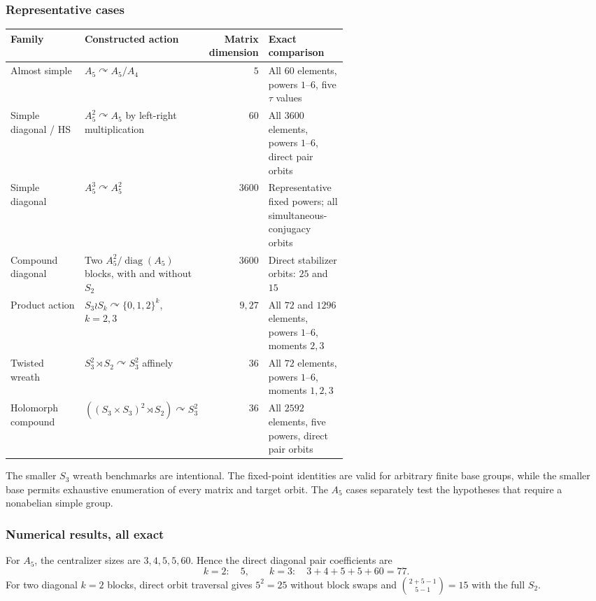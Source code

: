 \documentclass[10pt]{article}
\begin{document}
\subsubsection{Representative cases}

\begin{center}
\small
\begin{tabularx}{\linewidth}{@{}p{0.22\linewidth}p{0.34\linewidth}rX@{}}
\toprule
Family & Constructed action & Matrix dimension & Exact comparison \\
\midrule
Almost simple
& $A_5\curvearrowright A_5/A_4$
& $5$
& All $60$ elements, powers $1$--$6$, five $\tau$ values \\
Simple diagonal / HS
& $A_5^2\curvearrowright A_5$ by left-right multiplication
& $60$
& All $3600$ elements, powers $1$--$6$, direct pair orbits \\
Simple diagonal
& $A_5^3\curvearrowright A_5^2$
& $3600$
& Representative fixed powers; all simultaneous-conjugacy orbits \\
Compound diagonal
& Two $A_5^2/\operatorname{diag}(A_5)$ blocks, with and without $S_2$
& $3600$
& Direct stabilizer orbits: $25$ and $15$ \\
Product action
& $S_3\wr S_k\curvearrowright\{0,1,2\}^k$, $k=2,3$
& $9,27$
& All $72$ and $1296$ elements, powers $1$--$6$, moments $2,3$ \\
Twisted wreath
& $S_3^2\rtimes S_2\curvearrowright S_3^2$ affinely
& $36$
& All $72$ elements, powers $1$--$6$, moments $1,2,3$ \\
Holomorph compound
& $((S_3\times S_3)^2\rtimes S_2)\curvearrowright S_3^2$
& $36$
& All $2592$ elements, five powers, direct pair orbits \\
\bottomrule
\end{tabularx}
\end{center}

The smaller $S_3$ wreath benchmarks are intentional.  The fixed-point
identities are valid for arbitrary finite base groups, while the smaller base
permits exhaustive enumeration of every matrix and target orbit.  The
$A_5$ cases separately test the hypotheses that require a nonabelian simple
group.

\subsubsection{Numerical results, all exact}

For $A_5$, the centralizer sizes are $3,4,5,5,60$.  Hence the direct
diagonal pair coefficients are
\[
 k=2:\quad 5,
 \qquad
 k=3:\quad 3+4+5+5+60=77.
\]
For two diagonal $k=2$ blocks, direct orbit traversal gives $5^2=25$ without
block swaps and $\binom{2+5-1}{5-1}=15$ with the full $S_2$.
\end{document}
